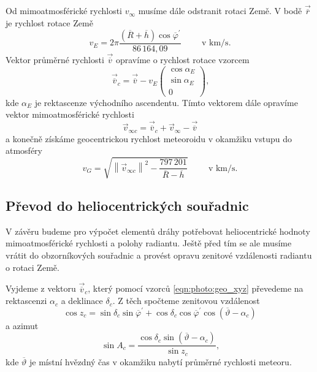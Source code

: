 Od mimoatmosférické rychlosti $v_\infty$ musíme dále odstranit rotaci Země. V bodě $\vec{\overline{r}}$ je rychlost rotace Země \cite{ceplecha}
\begin{equation}
    v_E=2\pi\frac{(\overline{R}+\overline{h})\cos{\overline{\varphi}^\prime}}{86\,164{,}09}\hspace{1cm}\text{v km/s.}
\end{equation}
Vektor průměrné rychlosti $\vec{\overline{v}}$ opravíme o rychlost rotace vzorcem \cite{ceplecha}
\begin{equation}
    \vec{\overline{v}}_c=\vec{\overline{v}}-v_E\begin{pmatrix}
        \cos{\alpha_E} \\
        \sin{\alpha_E} \\
        0
    \end{pmatrix}\text{,}
\end{equation}
kde $\alpha_E$ je rektascenze východního ascendentu. Tímto vektorem dále opravíme vektor mimoatmosférické rychlosti \cite{ceplecha}
\begin{equation}
    \vec{v}_{\infty c}=\vec{\overline{v}}_c+\vec{v}_\infty-\vec{\overline{v}}
\end{equation}
a konečně získáme geocentrickou rychlost meteoroidu v okamžiku vstupu do atmosféry \cite{ceplecha}
\begin{equation}
    v_G=\sqrt{
        \left\lVert\vec{v}_{\infty c}\right\rVert^2-
        \frac{797\,201}{\overline{R}-\overline{h}}
    }\hspace{1cm}\text{v km/s.}
\end{equation}

\subsection{Převod do heliocentrických souřadnic}%
V závěru budeme pro výpočet elementů dráhy potřebovat heliocentrické hodnoty mimoatmosférické rychlosti a polohy radiantu. Ještě před tím se ale musíme vrátit do obzorníkových souřadnic a provést opravu zenitové vzdálenosti radiantu o rotaci Země.

Vyjdeme z vektoru $\vec{\overline{v}}_c$, který pomocí vzorců \eqref{eqn:photo:geo_xyz} převedeme na rektascenzi $\alpha_c$ a deklinace $\delta_c$. Z těch spočteme zenitovou vzdálenost \cite{ceplecha}
\begin{equation}
    \cos{z_c}=\sin{\delta_c}\sin{\overline{\varphi}^\prime}+\cos{\delta_c}\cos{\overline{\varphi}^\prime}\cos{(\overline{\vartheta}-\alpha_c)}
\end{equation}
a azimut
\begin{equation}
    \sin{A_c}=\frac{\cos{\delta_c}\sin{(\overline{\vartheta}-\alpha_c)}}{\sin{z_c}}\text{,}
\end{equation}
kde $\overline{\vartheta}$ je místní hvězdný čas v okamžiku nabytí průměrné rychlosti meteoru.

